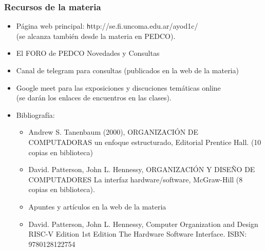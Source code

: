 \documentclass[aspectratio=169,compress]{beamer}
\begin{document}
\begin{frame}[fragile]
  \frametitle{Recursos de la materia}

\begin{small}
\begin{itemize}

\item Página web principal: \footnotesize{\texttt http://se.fi.uncoma.edu.ar/ayod1c/}\\
(se alcanza también desde la materia en PEDCO).

\item El FORO de PEDCO Novedades y Consultas
\item Canal de telegram para consultas (publicados en la web de la materia)
\item Google meet para las exposiciones y discuciones temáticas online\\ (se darán los enlaces de encuentros en las clases).
\item Bibliografía:

\begin{itemize}

\item Andrew S. Tanenbaum (2000), ORGANIZACIÓN DE COMPUTADORAS un enfoque estructurado, Editorial Prentice Hall. (10 copias en biblioteca)
\item David. Patterson, John L. Hennessy, ORGANIZACIÓN Y DISEÑO DE COMPUTADORES La interfaz hardware/software, McGraw-Hill (8 copias en biblioteca).
\item Apuntes y artículos en la web de la materia
\item David. Patterson, John L. Hennessy, Computer Organization and Design RISC-V Edition 1st Edition The Hardware Software Interface. ISBN: 9780128122754

\end{itemize}

\end{itemize}
\end{small}

\end{frame}
\end{document}
